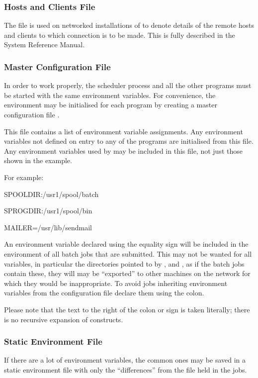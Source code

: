 \subsubsection{\manualProduct{} Hosts and Clients File}
The file \hostsfile is used on networked installations of \ProductName{} to denote details of the remote hosts and
clients to which connection is to be made. This is fully described in the System Reference Manual.

\subsubsection{\manualProduct{} Master Configuration File}
In order to work properly, the scheduler process and all the other programs must be started with the same environment variables. For
convenience, the environment may be initialised for each program by creating a master configuration file \masterconfig.

This file contains a list of environment variable assignments. Any environment variables not defined on entry to any of the programs are
initialised from this file. Any environment variables used by \ProductName{} may be included in this file, not just those shown in the example.

For example:

\begin{expara}

SPOOLDIR:/usr1/spool/batch

SPROGDIR:/usr1/spool/bin

MAILER=/usr/lib/sendmail

\end{expara}

An environment variable declared using the equality sign \exampletext{=} will be included in the environment of all
batch jobs that are submitted. This may not be wanted for all variables, in particular the directories pointed to by
,  and , as if the batch jobs contain these, they
will may be ``exported'' to other machines on the network for which they would be inappropriate. To avoid jobs
inheriting environment variables from the configuration file declare them using the colon.

Please note that the text to the right of the colon or \exampletext{=} sign is taken literally; there is no recursive
expansion of  constructs.

\subsubsection{\ProductName{} Static Environment File}
If there are a lot of environment variables, the common ones may be saved in a static environment file with only the
``differences'' from the file held in the jobs.

